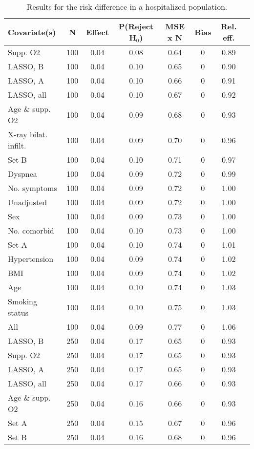 \documentclass{article}
\begin{document}
{\tabcolsep=6pt  %
\begin{longtable}{lccccccc}
\caption{Results for the risk difference in a hospitalized population.}\label{tab5}\\
Covariate(s) & N & Effect & P(Reject H$_0$) & MSE x N & Bias & Rel. eff.\\ \midrule
Supp. O2 & 100 & 0.04 & 0.08 & 0.64 & 0 & 0.89\\
LASSO, B & 100 & 0.04 & 0.10 & 0.65 & 0 & 0.90\\
LASSO, A & 100 & 0.04 & 0.10 & 0.66 & 0 & 0.91\\
LASSO, all & 100 & 0.04 & 0.10 & 0.67 & 0 & 0.92\\
Age \& supp. O2 & 100 & 0.04 & 0.09 & 0.68 & 0 & 0.93\\
X-ray bilat. infilt. & 100 & 0.04 & 0.09 & 0.70 & 0 & 0.96\\
Set B & 100 & 0.04 & 0.10 & 0.71 & 0 & 0.97\\
Dyspnea & 100 & 0.04 & 0.09 & 0.72 & 0 & 0.99\\
No. symptoms & 100 & 0.04 & 0.09 & 0.72 & 0 & 1.00\\
Unadjusted & 100 & 0.04 & 0.09 & 0.72 & 0 & 1.00\\
Sex & 100 & 0.04 & 0.09 & 0.73 & 0 & 1.00\\
No. comorbid & 100 & 0.04 & 0.10 & 0.73 & 0 & 1.00\\
Set A & 100 & 0.04 & 0.10 & 0.74 & 0 & 1.01\\
Hypertension & 100 & 0.04 & 0.09 & 0.74 & 0 & 1.02\\
BMI & 100 & 0.04 & 0.09 & 0.74 & 0 & 1.02\\
Age & 100 & 0.04 & 0.10 & 0.74 & 0 & 1.03\\
Smoking status & 100 & 0.04 & 0.10 & 0.75 & 0 & 1.03\\
All & 100 & 0.04 & 0.09 & 0.77 & 0 & 1.06\\ \midrule
LASSO, B & 250 & 0.04 & 0.17 & 0.65 & 0 & 0.93\\
Supp. O2 & 250 & 0.04 & 0.17 & 0.65 & 0 & 0.93\\
LASSO, A & 250 & 0.04 & 0.17 & 0.65 & 0 & 0.93\\
LASSO, all & 250 & 0.04 & 0.17 & 0.66 & 0 & 0.93\\
Age \& supp. O2 & 250 & 0.04 & 0.16 & 0.66 & 0 & 0.93\\
Set A & 250 & 0.04 & 0.15 & 0.67 & 0 & 0.96\\
Set B & 250 & 0.04 & 0.16 & 0.68 & 0 & 0.96\\

\end{longtable}}
\end{document}
